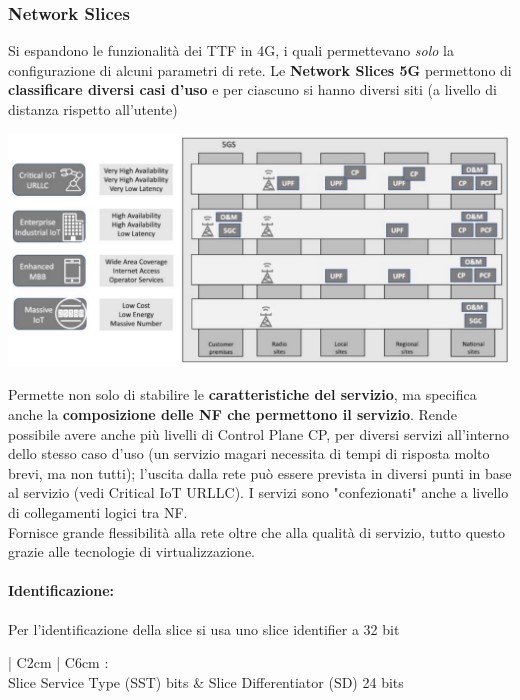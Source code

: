 \newpage

\subsubsection{Network Slices}

Si espandono le funzionalità dei TTF in 4G, i quali permettevano \textit{solo} la configurazione di alcuni parametri di rete. Le \textbf{Network Slices 5G} permettono di \textbf{classificare diversi casi d'uso} e per ciascuno si hanno diversi siti (a livello di distanza rispetto all'utente)
\begin{center}
	\includegraphics[width=0.97\linewidth]{img/5g/slicing}
\end{center}

Permette non solo di stabilire le \textbf{caratteristiche del servizio}, ma specifica anche la \textbf{composizione delle NF che permettono il servizio}. Rende possibile avere anche più livelli di Control Plane CP, per diversi servizi all'interno dello stesso caso d'uso (un servizio magari necessita di tempi di risposta molto brevi, ma non tutti); l'uscita dalla rete può essere prevista in diversi punti in base al servizio (vedi Critical IoT URLLC). I servizi sono "confezionati" anche a livello di collegamenti logici tra NF.\\

Fornisce grande flessibilità alla rete oltre che alla qualità di servizio, tutto questo grazie alle tecnologie di virtualizzazione.\\

\newpage

\paragraph{Identificazione:} Per l'identificazione della slice si usa uno slice identifier a 32 bit
\begin{center}
	\begin{tabular}{| C{2cm} | C{6cm} :}
		 \\
		 
		Slice Service Type (SST)  bits & Slice Differentiator (SD) 24 bits \\
		 
	\end{tabular}
\end{center}

